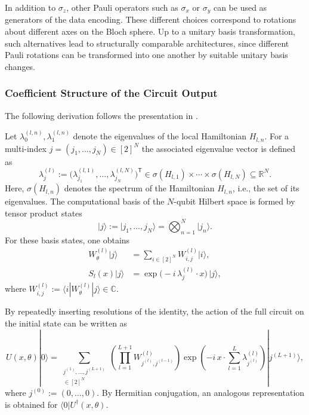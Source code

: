 In addition to $\sigma_z$, other Pauli operators such as $\sigma_x$ or $\sigma_y$ can be used as generators of the data encoding.
These different choices correspond to rotations about different axes on the Bloch sphere.
Up to a unitary basis transformation, such alternatives lead to structurally comparable architectures, since different Pauli rotations can be transformed into one another by suitable unitary basis changes.

\subsubsection{Coefficient Structure of the Circuit Output}
\label{sec:bg-vqc-evaluation}

The following derivation follows the presentation in \cite{holzer2024spectral}.

Let
\(
\lambda^{(l,n)}_0,\lambda^{(l,n)}_1
\)
denote the eigenvalues of the local Hamiltonian $H_{l,n}$.
For a multi-index
\(
j = (j_1,\dots,j_N) \in [2]^N
\)
the associated eigenvalue vector is defined as
\begin{equation}
\lambda^{(l)}_j
:=
\bigl(
\lambda^{(l,1)}_{j_1},\dots,\lambda^{(l,N)}_{j_N}
\bigr)^{\mathsf T}
\in
\sigma(H_{l,1}) \times \cdots \times \sigma(H_{l,N})
\subseteq \mathbb{R}^N.
\end{equation}
Here, $\sigma(H_{l,n})$ denotes the spectrum of the Hamiltonian $H_{l,n}$, i.e., the set of its eigenvalues.
The computational basis of the $N$-qubit Hilbert space is formed by tensor product states
\begin{equation}
|j\rangle := |j_1,\dots,j_N\rangle = \bigotimes_{n=1}^N |j_n\rangle.
\end{equation}
For these basis states, one obtains
\begin{align}
W^{(l)}_\theta |j\rangle
&=
\sum_{i \in [2]^N}
W^{(l)}_{i,j} |i\rangle,
\\
S_l(x)|j\rangle
&=
\exp\!\bigl(-i\,\lambda^{(l)}_j \cdot x\bigr)\,|j\rangle,
\end{align}
where
\(
W^{(l)}_{i,j} := \langle i | W^{(l)}_\theta | j \rangle \in \mathbb{C}.
\)

By repeatedly inserting resolutions of the identity, the action of the full circuit on the initial state can be written as
\begin{equation}
U(x,\theta)|0\rangle
=
\sum_{\substack{j^{(1)},\dots,j^{(L+1)}\\ \in [2]^N}}
\left(
\prod_{l=1}^{L+1}
W^{(l)}_{j^{(l)},j^{(l-1)}}
\right)
\exp\!\left(
-i\,x \cdot \sum_{l=1}^{L} \lambda^{(l)}_{j^{(l)}}
\right)
|j^{(L+1)}\rangle,
\end{equation}
where $j^{(0)} := (0,\dots,0)$.
By Hermitian conjugation, an analogous representation is obtained for
$\langle 0|U^\dagger(x,\theta)$.

